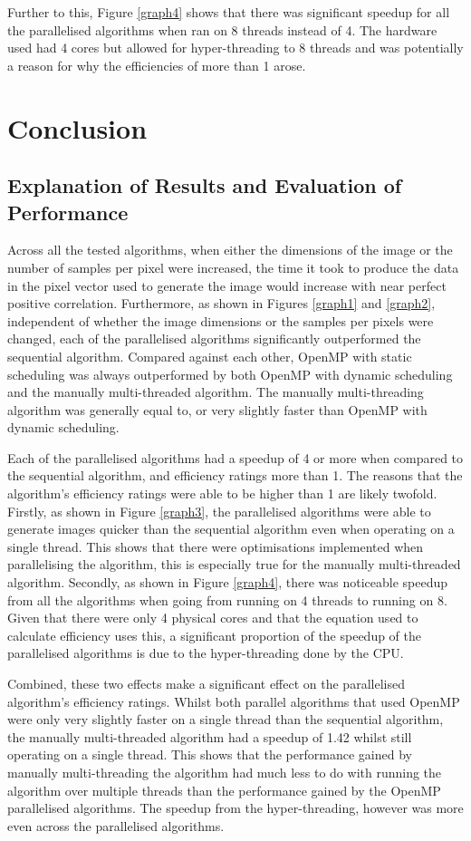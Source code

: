 \documentclass[12pt,journal,transmag]{IEEEtran}
\begin{document}
	Further to this, Figure \ref{graph4} shows that there was significant speedup for all the parallelised algorithms when ran on 8 threads instead of 4. The hardware used had 4 cores but allowed for hyper-threading to 8 threads and was potentially a reason for why the efficiencies of more than 1 arose.
	
	\section{Conclusion}
	\subsection{Explanation of Results and Evaluation of Performance}
	Across all the tested algorithms, when either the dimensions of the image or the number of samples per pixel were increased, the time it took to produce the data in the pixel vector used to generate the image would increase with near perfect positive correlation. Furthermore, as shown in Figures \ref{graph1} and \ref{graph2}, independent of whether the image dimensions or the samples per pixels were changed, each of the parallelised algorithms significantly outperformed the sequential algorithm. Compared against each other, OpenMP with static scheduling was always outperformed by both OpenMP with dynamic scheduling	 and the manually multi-threaded algorithm. The manually multi-threading algorithm was generally equal to, or very slightly faster than OpenMP with dynamic scheduling.
	
	Each of the parallelised algorithms had a speedup of 4 or more when compared to the sequential algorithm, and efficiency ratings more than 1. The reasons that the algorithm's efficiency ratings were able to be higher than 1 are likely twofold. Firstly, as shown in Figure \ref{graph3}, the parallelised algorithms were able to generate images quicker than the sequential algorithm even when operating on a single thread. This shows that there were optimisations implemented when parallelising the algorithm, this is especially true for the manually multi-threaded algorithm. Secondly, as shown in Figure \ref{graph4}, there was noticeable speedup from all the algorithms when going from running on 4 threads to running on 8. Given that there were only 4 physical cores and that the equation used to calculate efficiency uses this, a significant proportion of the speedup of the parallelised algorithms is due to the hyper-threading done by the CPU. 
	
	Combined, these two effects make a significant effect on the parallelised algorithm's efficiency ratings. Whilst both parallel algorithms that used OpenMP were only very slightly faster on a single thread than the sequential algorithm, the manually multi-threaded algorithm had a speedup of 1.42 whilst still operating on a single thread. This shows that the performance gained by manually multi-threading the algorithm had much less to do with running the algorithm over multiple threads than the performance gained by the OpenMP parallelised algorithms. The speedup from the hyper-threading, however was more even across the parallelised algorithms.
	
\end{document}
